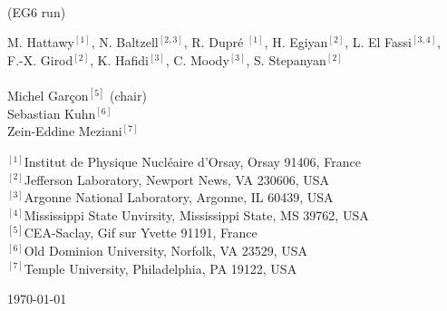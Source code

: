 \begin{titlepage}
\mainmatter
  {%

   
       \vspace*{+3.0cm}
   
     \begin{center}
       \\

          \vspace*{+1.5cm}          \\
       \vspace*{0.15cm}
        \\
       \vspace*{1.0cm}
       \noindent \fontsize{16}{19}\selectfont (EG6 run)  \\
       \vspace*{0.8cm}

       \noindent \fontsize{14}{19}\selectfont M. Hattawy$^{[1]}$, N. Baltzell$^{[2,3]}$, R. Dupr\'e $^{[1]}$, H. Egiyan$^{[2]}$, L. El Fassi$^{[3,4]}$,\\ F.-X. Girod$^{[2]}$, K. Hafidi$^{[3]}$, C. Moody$^{[3]}$, S. Stepanyan$^{[2]}$  \\
       
       \vspace{+0.8cm}
         \\ 
      \vspace{+0.2cm}
       Michel Gar\c{c}on$^{[5]}$ (chair)\\
       Sebastian Kuhn$^{[6]}$ \\
       Zein-Eddine Meziani$^{[7]}$       
       
       \vspace*{1.1cm}       
       
        \normalsize $^{[1]}$Institut de Physique Nucl{\'e}aire d'Orsay, Orsay 91406, France \\
        \normalsize $^{[2]}$Jefferson Laboratory, Newport News, VA 230606, USA\\
        \normalsize $^{[3]}$Argonne National Laboratory, Argonne, IL 60439, USA \\
        \normalsize $^{[4]}$Mississippi State Unvirsity, Mississippi State, MS 39762, USA\\  
        \normalsize $^{[5]}$CEA-Saclay, Gif sur Yvette 91191, France\\  
        \normalsize $^{[6]}$Old Dominion University, Norfolk, VA 23529, USA\\
        \normalsize $^{[7]}$Temple University, Philadelphia, PA 19122, USA\\    
        \vspace{3.0cm}


    \today
     \end{center}

  }


  \newpage
  \thispagestyle{plain}


\end{titlepage}
\sloppy

\titlepage
